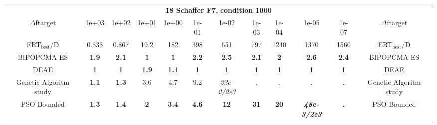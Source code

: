 \begin{tabular}{cccccccccccc}
 & \multicolumn{10}{c}{{\normalsize \textbf{18 Schaffer F7, condition 1000}}}\\
$\Delta$ftarget& 1e+03& 1e+02& 1e+01& 1e+00& 1e-01& 1e-02& 1e-03& 1e-04& 1e-05& 1e-07 & $\Delta$ftarget \\
ERT$_{\textrm{best}}$/D& 0.333& 0.867& 19.2& 182& 398& 651& 797& 1240& 1370& 1560 & ERT$_{\textrm{best}}$/D \\
\hline
BIPOPCMA-ES & \textbf{1.9} & \textbf{2.1} & \textbf{1} & \textbf{1} & \textbf{2.2} & \textbf{2.5} & \textbf{2.1} & \textbf{2} & \textbf{2.6} & \textbf{2.4} & BIPOPCMA-ES \cite{add_an_entry_for_BIPOPCMA-ES_in_bbob.bib}\\
DEAE & \textbf{1} & \textbf{1} & \textbf{1.9} & \textbf{1.1} & \textbf{1} & \textbf{1} & \textbf{1} & \textbf{1} & \textbf{1} & \textbf{1} & DEAE \cite{add_an_entry_for_DEAE_in_bbob.bib}\\
Genetic Algoritm study & \textbf{1.1} & \textbf{1.3} & 3.6 & 4.7 & 9.2 & \textit{22e-2}\textit{/2e3} & . & . & \textbf{.} & \textbf{.} & Genetic Algoritm study \cite{add_an_entry_for_Genetic Algoritm study_in_bbob.bib}\\
PSO Bounded & \textbf{1.3} & \textbf{1.4} & \textbf{2} & \textbf{3.4} & \textbf{4.6} & \textbf{12} & \textbf{31} & \textbf{20} & \textbf{\textit{48e-3}\textit{/2e3}} & \textbf{.} & PSO Bounded \cite{add_an_entry_for_PSO Bounded_in_bbob.bib}
\end{tabular}
